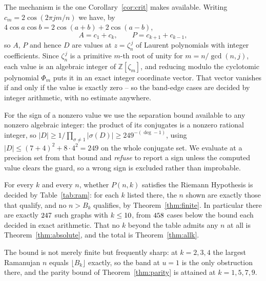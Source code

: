 The mechanism is the one Corollary~\ref{cor:crit} makes available. Writing
$c_m=2\cos(2\pi jm/n)$ we have, by $4\cos a\cos b=2\cos(a+b)+2\cos(a-b)$,
\[
  A=c_1+c_k,\qquad P=c_{k+1}+c_{k-1},
\]
so $A$, $P$ and hence $D$ are values at $z=\zeta_n^{\,j}$ of Laurent
polynomials with integer coefficients. Since $\zeta_n^{\,j}$ is a primitive
$m$-th root of unity for $m=n/\gcd(n,j)$, each value is an algebraic integer of
$\mathbb Z[\zeta_m]$, and reducing modulo the cyclotomic polynomial $\Phi_m$
puts it in an exact integer coordinate vector. That vector vanishes if and only
if the value is exactly zero -- so the band-edge cases are decided by integer
arithmetic, with no estimate anywhere.

For the sign of a nonzero value we use the separation bound available to any
nonzero algebraic integer: the product of its conjugates is a nonzero rational
integer, so $|D|\ge1\big/\prod_{\sigma\ne1}|\sigma(D)|\ge 249^{-(\deg-1)}$,
using $|D|\le(7+4)^2+8\cdot4^2=249$ on the whole conjugate set. We evaluate at
a precision set from that bound and \emph{refuse} to report a sign unless the
computed value clears the guard, so a wrong sign is excluded rather than
improbable.

\begin{theorem}\label{thm:ramclass}
For every $k$ and every $n$, whether $P(n,k)$ satisfies the Riemann Hypothesis
is decided by Table~\ref{tab:ram}: for each $k$ listed there, the $n$ shown are
exactly those that qualify, and no $n>B_k$ qualifies, by
Theorem~\ref{thm:finite}. In particular there are exactly $247$ such
graphs with $k\le10$, from $458$ cases below the bound each decided
in exact arithmetic. That no $k$ beyond the table admits any $n$ at all is
Theorem~\ref{thm:absolute}, and the total is Theorem~\ref{thm:allk}.
\end{theorem}

\begin{table}[h]
\centering
\footnotesize
\setlength{\tabcolsep}{4pt}

\caption{The complete classification, every $n$ and every $k$. For each $k$,
$B_k$ is the per-$k$ bound of Theorem~\ref{thm:finite}; the rows stop at
$k=\RamAllMaxK$ because by Theorem~\ref{thm:absolute} no larger $k$ admits any
$n$ at all. Generated directly from the certification run.}
\label{tab:ram}
\end{table}

The bound is not merely finite but frequently sharp: at $k=2,3,4$ the largest
Ramanujan $n$ equals $\lfloor B_k\rfloor$ exactly, so the band at $u=1$ is the
only obstruction there, and the parity bound of Theorem~\ref{thm:parity} is
attained at $k=1,5,7,9$.

